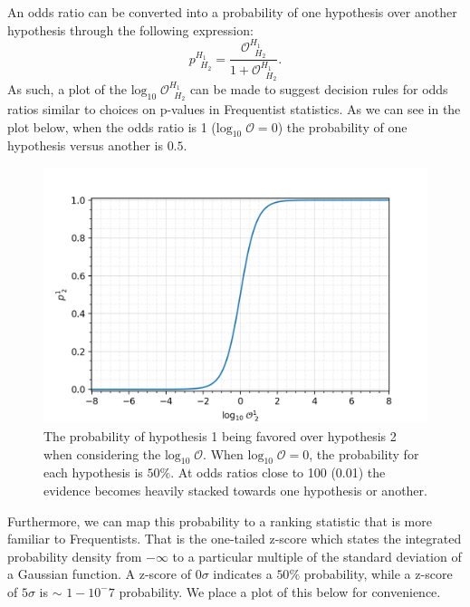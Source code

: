 An odds ratio can be converted into a probability of one hypothesis over another hypothesis through the following expression:
\begin{equation}\label{eqn:probability_odds_ratio}
    p^{H_1 \;\;}_{\;\;H_2} = \frac{\mathcal{O}^{H_1\;\;}_{\;\;H_2}}{1 + \mathcal{O}^{H_1\;\;}_{\;\;H_2}}.
\end{equation}
As such, a plot of the $\mathrm{log}_{10} \; \mathcal{O}^{H_1\;\;}_{\;\;H_2}$ can be made to suggest decision rules for odds ratios similar to choices on p-values in Frequentist statistics. As we can see in the plot below, when the odds ratio is 1 ($\mathrm{log}_{10} \; \mathcal{O} = 0$) the probability of one hypothesis versus another is $0.5$. 
\begin{figure}
  \includegraphics[width=\linewidth]{figs/chapter2/log10odds_probability.png}
  \caption{The probability of hypothesis 1 being favored over hypothesis 2 when considering the $\mathrm{log}_{10} \; \mathcal{O}$. When $\mathrm{log}_{10} \; \mathcal{O} = 0$, the probability for each hypothesis is $50\%$. At odds ratios close to 100 (0.01) the evidence becomes heavily stacked towards one hypothesis or another.}
  \label{fig:log10odds_v_probability}
\end{figure}
Furthermore, we can map this probability to a ranking statistic that is more familiar to Frequentists. That is the one-tailed z-score which states the integrated probability density from $-\infty$ to a particular multiple of the standard deviation of a Gaussian function. A z-score of $0 \sigma$ indicates a $50\%$ probability, while a z-score of $5 \sigma$ is $\sim$ $1-10^-7$ probability. We place a plot of this below for convenience.
